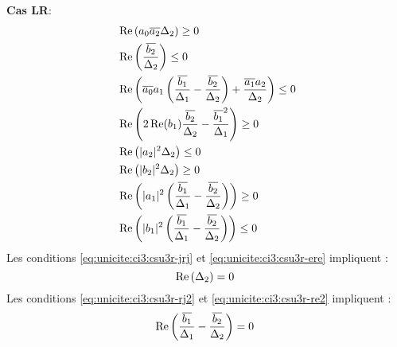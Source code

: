   \begin{minipage}{0.49\textwidth}
    \textbf{Cas LR}:
    \begin{align}
      \label{eq:unicite:ci3:csu3r-j2}&\Re\left(a_0\conj{a_2}\Delta_2\right) \ge 0 \\
      \label{eq:unicite:ci3:csu3r-e2}&\Re\left(\frac{\conj{b_2}}{\Delta_2}\right) \le 0 \\
      \label{eq:unicite:ci3:csu3r-jdj}&\Re\left(\conj{a_0}a_1\left(\frac{\conj{b_1}}{\Delta_1}-\frac{\conj{b_2}}{\Delta_2}\right) + \frac{\conj{a_1}a_2}{\Delta_2} \right)\le 0\\
      \label{eq:unicite:ci3:csu3r-ede}&\Re\left(2\Re(b_1)\frac{\conj{b_2}}{\Delta_2}-\frac{\conj{b_1}^2}{\Delta_1}\right) \ge 0\\
      \label{eq:unicite:ci3:csu3r-jrj}&\Re\left(|a_2|^2\Delta_2\right) \le 0 \\
      \label{eq:unicite:ci3:csu3r-ere}&\Re\left(|b_2|^2\Delta_2\right) \ge 0 \\
      \label{eq:unicite:ci3:csu3r-rj2}&\Re\left(|a_1|^2\left(\frac{\conj{b_1}}{\Delta_1}-\frac{\conj{b_2}}{\Delta_2}\right)\right)\ge 0\\
      \label{eq:unicite:ci3:csu3r-re2}&\Re\left(|b_1|^2\left(\frac{\conj{b_1}}{\Delta_1}-\frac{\conj{b_2}}{\Delta_2}\right)\right)\le 0
    \end{align}
    Les conditions \eqref{eq:unicite:ci3:csu3r-jrj} et \eqref{eq:unicite:ci3:csu3r-ere} impliquent :
    \begin{equation}
      \Re\left(\Delta_2\right) = 0\\\
    \end{equation}
    Les conditions \eqref{eq:unicite:ci3:csu3r-rj2} et \eqref{eq:unicite:ci3:csu3r-re2} impliquent :
    \begin{equation}
      \Re\left(\frac{\conj{b_1}}{\Delta_1}-\frac{\conj{b_2}}{\Delta_2}\right) = 0\\\
    \end{equation}
  \end{minipage}
